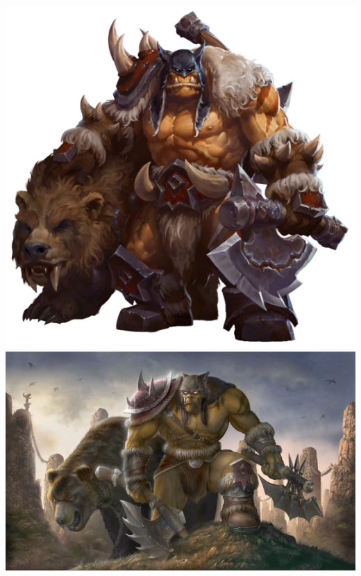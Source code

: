 \begin{center}
	\includegraphics[width=0.38\linewidth]{img/WoW/Rexxar2.png}
	\includegraphics[width=0.6\linewidth]{img/WoW/Rex.jpg}
\end{center}
